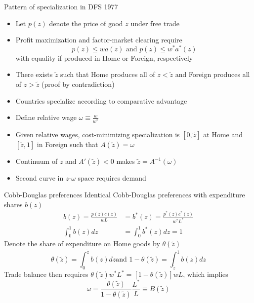 \documentclass[10pt,notes=hide]{beamer}
\begin{document}
\begin{frame}{Pattern of specialization in DFS 1977}
\begin{itemize}
	\item Let $p(z)$ denote the price of good $z$ under free trade
	\item Profit maximization and factor-market clearing require
		\vspace{-2mm}
		\begin{equation*}p(z) \leq w a(z)   \text{ and } p(z) \leq w^{*} a^{*}(z) \end{equation*}
		with equality if produced in Home or Foreign, respectively
	\item There exists $\tilde{z}$ such that Home produces all of $z<\tilde{z}$ and Foreign produces all of $z>\tilde{z}$ (proof by contradiction)
	\item Countries specialize according to comparative advantage
	\item Define relative wage $\omega \equiv \frac{w}{w^*}$
	\item Given relative wages, cost-minimizing specialization is $[0,\tilde{z}]$ at Home and $[\tilde{z},1]$ in Foreign such that $A(\tilde{z}) = \omega$
	\item Continuum of $z$ and $A'(\tilde{z})<0$ makes $\tilde{z} = A^{-1}(\omega)$
	\item Second curve in $z$-$\omega$ space requires demand
\end{itemize}
\end{frame}
\begin{frame}{Cobb-Douglas preferences}
Identical Cobb-Douglas preferences with expenditure shares $b(z)$
\begin{align*}
b\left(z\right) 	 =\frac{p\left(z\right) c\left(z\right) }{wL}
&=b^{*}\left(z\right) =\frac{p^{\ast}\left(z\right) c^{\ast}\left(z\right)}{w^{\ast}L^{\ast}}
\\
\int_{0}^{1}b\left(z\right) dz 
& = \int_{0}^{1}b^{\ast}\left(z\right) dz
=1
\end{align*}
Denote the share of expenditure on Home goods by $\theta\left(\tilde{z}\right)$
\begin{equation*}
\theta \left( \tilde{z}\right) =\int_{0}^{\tilde{z}}b\left( z\right) dz\text{
\ \ \ and \ \ \ }1-\theta \left( \tilde{z}\right) =\int_{\tilde{z}%
}^{1}b\left( z\right) dz
\end{equation*}
Trade balance then requires 
$\theta \left(\tilde{z}\right) w^{*}L^{*}
=\left[1-\theta \left(\tilde{z}\right) \right] wL$,
which implies
\begin{equation*}
\omega =\frac{\theta \left(\tilde{z}\right) }{1-\theta \left(\tilde{z}%
\right) }\frac{L^{*}}{L}\equiv B\left(\tilde{z}\right)
\end{equation*}
\end{frame}
\end{document}
